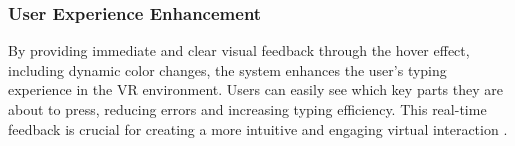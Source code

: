 \subsubsection{User Experience Enhancement}

By providing immediate and clear visual feedback through the hover effect, including dynamic color changes, the system enhances the user's typing experience in the VR environment. Users can easily see which key parts they are about to press, reducing errors and increasing typing efficiency. This real-time feedback is crucial for creating a more intuitive and engaging virtual interaction \cite{norman2013design}.

















